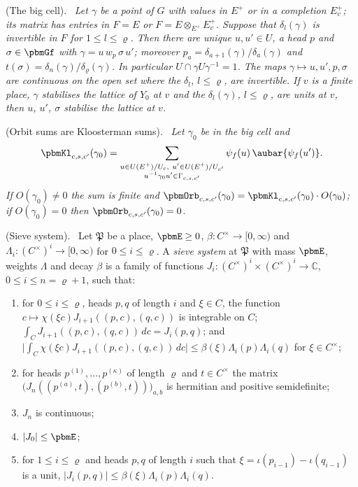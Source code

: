 \documentclass[10pt]{amsart}
\theoremstyle{definition}
\theoremstyle{remark}
\newcommand{\C}{\mathbb C}
\newenvironment{quotedthm}[2]{\par\medskip\noindent\begingroup
  \textbf{#1}#2.\ \itshape\ignorespaces}{\endgroup\par\medskip}
\newenvironment{quoteddef}[2]{\par\medskip\noindent\begingroup
  \textbf{#1}#2.\ \ignorespaces}{\endgroup\par\medskip}
\begin{document}
\begin{quotedthm}{\cite[Proposition~3.41]{P51}}{ (The big cell)}
Let $\gamma$ be a point of $G$ with values in $E^+$ or in a completion $E^+_v$; its matrix has
entries in $F=E$ or $F=E\otimes_{E^+}E^+_v$. Suppose that $\delta_l(\gamma)$ is invertible in $F$ for
$1\le l\le\varrho$. Then there are unique $u,u'\in U$, a
head $p$ and $\sigma\in\pbmGf$ with $\gamma=u\,w_p\,\sigma\,u'$; moreover $p_a=\delta_{a+1}(\gamma)/
\delta_a(\gamma)$ and $t(\sigma)=\delta_n(\gamma)/\delta_\varrho(\gamma)$. In particular $U\cap\gamma
U\gamma^{-1}=1$. The maps $\gamma\mapsto u,u',p,\sigma$ are continuous on the open set where the
$\delta_l$, $l\le\varrho$, are invertible. If $v$ is a finite place, $\gamma$ stabilises the lattice
of $Y_0$ at $v$ and the $\delta_l(\gamma)$, $l\le\varrho$, are units at $v$, then $u$, $u'$,
$\sigma$ stabilise the lattice at $v$.
\end{quotedthm}

\begin{quotedthm}{\cite[Proposition~3.42]{P51}}{ (Orbit sums are Kloosterman sums)}
Let $\gamma_0$ be in the big cell and
\[
\pbmKl_{c,s,c'}(\gamma_0)=\sum_{\substack{u\in U(E^+)/U_c,\ u'\in U(E^+)/U_{c'}\\ u^{-1}\gamma_0u'\in\Gamma_{c,s,
c'}}}\psi_f(u)\,\aubar{\psi_f(u')} .
\]
If $O(\gamma_0)\ne0$ the sum is finite and $\pbmOrb_{c,s,c'}(\gamma_0)=\pbmKl_{c,s,c'}(\gamma_0)\cdot
O(\gamma_0)$; if $O(\gamma_0)=0$ then $\pbmOrb_{c,s,c'}(\gamma_0)=0$.
\end{quotedthm}

\begin{quoteddef}{\cite[Definition~3.44]{P51}}{ (Sieve system)}
Let $\mathfrak P$ be a place, $\pbmE\ge0$, $\beta\colon C^\times\to[0,\infty)$ and $\Lambda_i\colon
(C^\times)^i\to[0,\infty)$ for $0\le i\le\varrho$. A \emph{sieve system} at $\mathfrak P$ with mass
$\pbmE$, weights $\Lambda$ and decay $\beta$ is a family of functions $J_i\colon(C^\times)^i\times
(C^\times)^i\to\C$, $0\le i\le n=\varrho+1$, such that:
\begin{enumerate}
\item[(S1)] for $0\le i\le\varrho$, heads $p,q$ of length $i$ and $\xi\in C$, the function $c\mapsto
\chi(\xi c)J_{i+1}((p,c),(q,c))$ is integrable on $C$; $\int_CJ_{i+1}((p,c),(q,c))\,dc=J_i(p,q)$; and
$\bigl|\int_C\chi(\xi c)J_{i+1}((p,c),(q,c))\,dc\bigr|\le\beta(\xi)\Lambda_i(p)\Lambda_i(q)$ for
$\xi\in C^\times$;
\item[(S2)] for heads $p^{(1)},\dots,p^{(\kappa)}$ of length $\varrho$ and $t\in C^\times$ the matrix
$\bigl(J_n((p^{(a)},t),(p^{(b)},t))\bigr)_{a,b}$ is hermitian and positive semidefinite;
\item[(S3)] $J_n$ is continuous;
\item[(S4)] $|J_0|\le\pbmE$;
\item[(S5)] for $1\le i\le\varrho$ and heads $p,q$ of length $i$ such that $\xi=\iota(p_{i-1})-\iota(
q_{i-1})$ is a unit, $|J_i(p,q)|\le\beta(\xi)\Lambda_i(p)\Lambda_i(q)$.
\end{enumerate}
\end{quoteddef}
\end{document}

